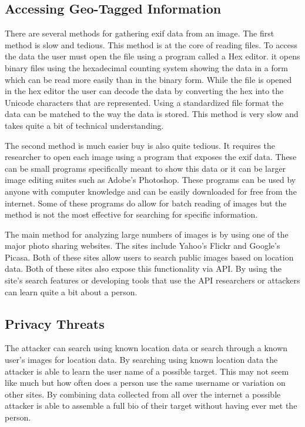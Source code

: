 \subsection{Accessing Geo-Tagged Information} 
There are several methods for gathering exif data from an image. The first
method is slow and tedious. This method is at the core of reading files. To
access the data the user must open the file using a program called a Hex editor.
it opens binary files using the hexadecimal counting system showing the data in
a form which can be read more easily than in the binary form. While the file is
opened in the hex editor the user can decode the data by converting the hex into
the Unicode characters that are represented. Using a standardized file format
the data can be matched to the way the data is stored. This method is very slow
and takes quite a bit of technical understanding.

The second method is much easier buy is also quite tedious. It requires the
researcher to open each image using a program that exposes the exif data. These
can be small programs specifically meant to show this data or it can be larger
image editing suites such as Adobe's Photoshop. These programs can be used by
anyone with computer knowledge and can be easily downloaded for free from the
internet. Some of these programs do allow for batch reading of images but the
method is not the most effective for searching for specific information.

The main method for analyzing large numbers of images is by using one of the
major photo sharing websites. The sites include Yahoo's Flickr and Google's
Picasa. Both of these sites allow users to search public images based on
location data. Both of these sites also expose this functionality via API. By
using the site's search features or developing tools that use the API
researchers or attackers can learn quite a bit about a person.

\subsection{Privacy Threats} The attacker can search using known location data
or search through a known user's images for location data. By searching using
known location data the attacker is able to learn the user name of a possible
target. This may not seem like much but how often does a person use the same
username or variation on other sites. By combining data collected from all over
the internet a possible attacker is able to assemble a full bio of their target
without having ever met the person.

